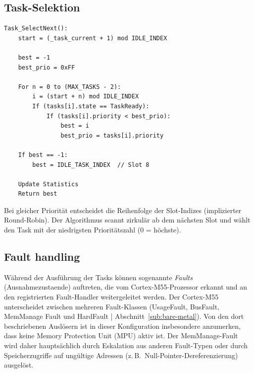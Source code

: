 \newpage

\subsection{Task-Selektion}\label{sub:task-selektion}

\begin{lstlisting}[language=pseudocode, numbers=none, caption={Selection of the next task to execute}, label={lst:task-select}]
Task_SelectNext():
    start = (_task_current + 1) mod IDLE_INDEX

    best = -1
    best_prio = 0xFF

    For n = 0 to (MAX_TASKS - 2):
        i = (start + n) mod IDLE_INDEX
        If (tasks[i].state == TaskReady):
            If (tasks[i].priority < best_prio):
                best = i
                best_prio = tasks[i].priority

    If best == -1:
        best = IDLE_TASK_INDEX  // Slot 8

    Update Statistics
    Return best
\end{lstlisting}

Bei gleicher Priorität entscheidet die Reihenfolge der Slot-Indizes (implizierter Round-Robin). Der Algorithmus scannt zirkulär ab dem nächsten Slot und wählt den Task mit der niedrigsten Prioritätszahl (0 = höchste).

\subsection{Fault handling}\label{sub:fault-handling}

Während der Ausführung der Tasks können sogenannte \emph{Faults} (Ausnahmezustaende) auftreten, die vom Cortex-M55-Prozessor erkannt und an den registrierten Fault-Handler weitergeleitet werden. Der Cortex-M55 unterscheidet zwischen mehreren Fault-Klassen (UsageFault, BusFault, MemManage Fault und HardFault | Abschnitt~\ref{sub:bare-metal}). Von den dort beschriebenen Auslösern ist in dieser Konfiguration insbesondere anzumerken, dass keine Memory Protection Unit (MPU) aktiv ist. Der MemManage-Fault wird daher hauptsächlich durch Eskalation aus anderen Fault-Typen oder durch Speicherzugriffe auf ungültige Adressen (z.\,B.\ Null-Pointer-Dereferenzierung) ausgelöst.

